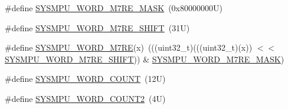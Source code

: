 \begin{DoxyCompactItemize}
\item 
\#define \mbox{\hyperlink{group___s_y_s_m_p_u___register___masks_ga3dac1542d2ff73792ea5ee9a7c703b5c}{S\+Y\+S\+M\+P\+U\+\_\+\+W\+O\+R\+D\+\_\+\+M7\+R\+E\+\_\+\+M\+A\+SK}}~(0x80000000\+U)
\item 
\#define \mbox{\hyperlink{group___s_y_s_m_p_u___register___masks_ga93e5aa5b536b88bb00efea67bb5c49b8}{S\+Y\+S\+M\+P\+U\+\_\+\+W\+O\+R\+D\+\_\+\+M7\+R\+E\+\_\+\+S\+H\+I\+FT}}~(31\+U)
\item 
\#define \mbox{\hyperlink{group___s_y_s_m_p_u___register___masks_ga2183d6d680d29c42637d4484479cd5e0}{S\+Y\+S\+M\+P\+U\+\_\+\+W\+O\+R\+D\+\_\+\+M7\+RE}}(x)~(((uint32\+\_\+t)(((uint32\+\_\+t)(x)) $<$$<$ \mbox{\hyperlink{group___s_y_s_m_p_u___register___masks_ga93e5aa5b536b88bb00efea67bb5c49b8}{S\+Y\+S\+M\+P\+U\+\_\+\+W\+O\+R\+D\+\_\+\+M7\+R\+E\+\_\+\+S\+H\+I\+FT}})) \& \mbox{\hyperlink{group___s_y_s_m_p_u___register___masks_ga3dac1542d2ff73792ea5ee9a7c703b5c}{S\+Y\+S\+M\+P\+U\+\_\+\+W\+O\+R\+D\+\_\+\+M7\+R\+E\+\_\+\+M\+A\+SK}})
\item 
\#define \mbox{\hyperlink{group___s_y_s_m_p_u___register___masks_gab884871b2c660b896506055dde6dce11}{S\+Y\+S\+M\+P\+U\+\_\+\+W\+O\+R\+D\+\_\+\+C\+O\+U\+NT}}~(12\+U)
\item 
\#define \mbox{\hyperlink{group___s_y_s_m_p_u___register___masks_ga8a45931ec5e60a7c8819214c9928eb96}{S\+Y\+S\+M\+P\+U\+\_\+\+W\+O\+R\+D\+\_\+\+C\+O\+U\+N\+T2}}~(4\+U)
\end{DoxyCompactItemize}
